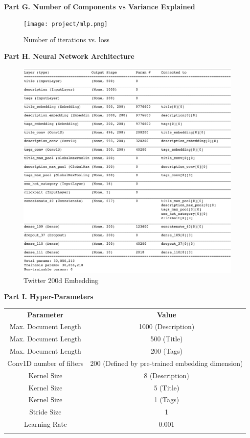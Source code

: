\documentclass[english]{article}
\begin{document}
\bf{Part G. Number of Components vs Variance Explained}

    \begin{itemize}
    \begin{figure}[H]
    \centering
    \texttt{[image: project/mlp.png]}
    \caption{Number of iterations vs. loss}
    \label{fig:mlp}
\end{figure} 
\end{itemize}


\pagebreak
\bf{Part H. Neural Network Architecture}
    
    \begin{figure}[H]
      \centering
        \includegraphics[scale=0.45]{nn_1.png}
        \caption{Twitter 200d Embedding}
    \end{figure}
    

\bf{Part I. Hyper-Parameters}\\
\begin{table}[H]
\centering
\begin{tabular}{||c||c||}
        \hhline{|=|=|}
        \textbf{Parameter}&\textbf{Value}\\
        \hhline{|=|=|}
            Max. Document Length &1000 (Description)\\
            Max. Document Length &500 (Title)\\
            Max. Document Length &200 (Tags)\\
            Conv1D number of filters &200 (Defined by pre-trained embedding dimension)\\
            Kernel Size &8 (Description)\\
            Kernel Size &5 (Title)\\
            Kernel Size &1 (Tags)\\
            Stride Size &1\\
            Learning Rate & 0.001\\
        \hhline{|=|=|}
\end{tabular}\\
\end{table}
\end{document}
